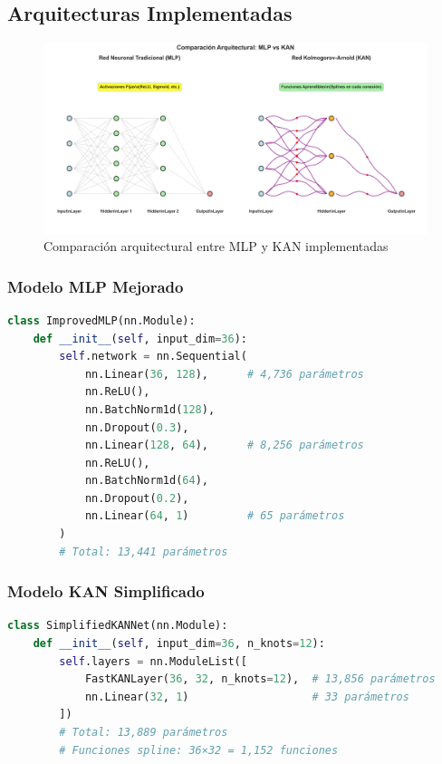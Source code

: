 \documentclass[10pt,twocolumn]{article}
\begin{document}
\subsection{Arquitecturas Implementadas}

\begin{figure}[H]
    \centering
    \includegraphics[width=\textwidth]{reports/figura_1_arquitectura_comparativa.png}
    \caption{Comparación arquitectural entre MLP y KAN implementadas}
    \label{fig:architecture}
\end{figure}

\subsubsection{Modelo MLP Mejorado}

\begin{lstlisting}[language=Python, caption=Arquitectura MLP implementada]
class ImprovedMLP(nn.Module):
    def __init__(self, input_dim=36):
        self.network = nn.Sequential(
            nn.Linear(36, 128),      # 4,736 parámetros
            nn.ReLU(),
            nn.BatchNorm1d(128),
            nn.Dropout(0.3),
            nn.Linear(128, 64),      # 8,256 parámetros  
            nn.ReLU(),
            nn.BatchNorm1d(64),
            nn.Dropout(0.2),
            nn.Linear(64, 1)         # 65 parámetros
        )
        # Total: 13,441 parámetros
\end{lstlisting}

\subsubsection{Modelo KAN Simplificado}

\begin{lstlisting}[language=Python, caption=Arquitectura KAN implementada]
class SimplifiedKANNet(nn.Module):
    def __init__(self, input_dim=36, n_knots=12):
        self.layers = nn.ModuleList([
            FastKANLayer(36, 32, n_knots=12),  # 13,856 parámetros
            nn.Linear(32, 1)                   # 33 parámetros
        ])
        # Total: 13,889 parámetros
        # Funciones spline: 36×32 = 1,152 funciones
\end{lstlisting}
\end{document}
